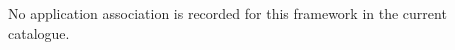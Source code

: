 \noindent No application association is recorded for this framework in the current catalogue.\par\medskip
